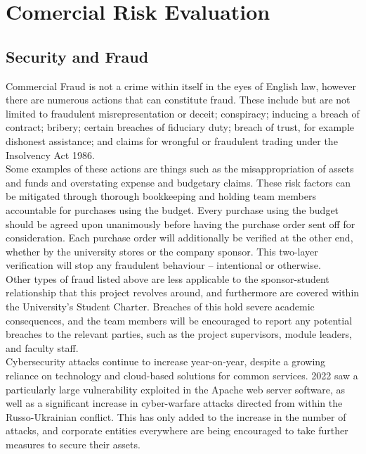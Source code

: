 \documentclass [12pt]{article}
\begin{document}
\section{Comercial Risk Evaluation}\label{sec:Commercial_Risk}

\subsection{Security and Fraud}\label{sec:Security_and_Fraud}

Commercial Fraud is not a crime within itself in the eyes of English law, however there are numerous actions that can constitute fraud. These include but are not limited to fraudulent misrepresentation or deceit; conspiracy; inducing a breach of contract; bribery; certain breaches of fiduciary duty; breach of trust, for example dishonest assistance; and claims for wrongful or fraudulent trading under the Insolvency Act 1986.
\\
Some examples of these actions are things such as the misappropriation of assets and funds and overstating expense and budgetary claims. These risk factors can be mitigated through thorough bookkeeping and holding team members accountable for purchases using the budget. Every purchase using the budget should be agreed upon unanimously before having the purchase order sent off for consideration. Each purchase order will additionally be verified at the other end, whether by the university stores or the company sponsor. This two-layer verification will stop any fraudulent behaviour – intentional or otherwise.
\\
Other types of fraud listed above are less applicable to the sponsor-student relationship that this project revolves around, and furthermore are covered within the University’s Student Charter. Breaches of this hold severe academic consequences, and the team members will be encouraged to report any potential breaches to the relevant parties, such as the project supervisors, module leaders, and faculty staff.
\\
Cybersecurity attacks continue to increase year-on-year, despite a growing reliance on technology and cloud-based solutions for common services. 2022 saw a particularly large vulnerability exploited in the Apache web server software, as well as a significant increase in cyber-warfare attacks directed from within the Russo-Ukrainian conflict. This has only added to the increase in the number of attacks, and corporate entities everywhere are being encouraged to take further measures to secure their assets.
\end{document}
